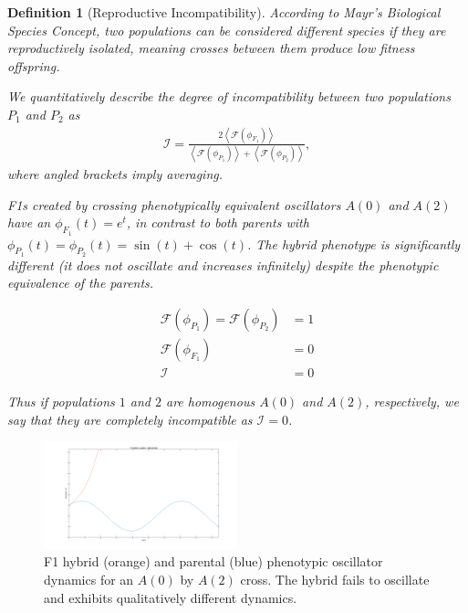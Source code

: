 \documentclass{article}
\newcommand{\1}{\mathbbm{1}}
\newtheorem{definition}{Definition}
\newtheorem{example}{Example}
\begin{document}
      \begin{definition}[Reproductive Incompatibility]
        According to Mayr's \emph{Biological Species Concept}, two populations can be considered different species if they are reproductively isolated, meaning crosses between them produce low fitness offspring.
        
        We quantitatively describe the degree of incompatibility between two populations $P_{1}$ and $P_{2}$ as
        \begin{align*}
          \mathcal{I} = \frac{2 \left\langle \mathcal{F} \left(\phi_{F_{1}}\right) \right\rangle}{\left\langle \mathcal{F} \left(\phi_{P_{1}}\right) \right\rangle +  \left\langle \mathcal{F} \left(\phi_{P_{2}}\right) \right\rangle} ,
        \end{align*}
        where angled brackets imply averaging. 

        F1s created by crossing phenotypically equivalent oscillators $A(0)$ and $A(2)$ have an $\phi_{F_{1}}(t) = e^{t}$, in contrast to both parents with $\phi_{P_{1}}(t) = \phi_{P_{2}}(t) = \sin(t) + \cos(t)$. The hybrid phenotype is significantly different (it does not oscillate and increases infinitely) despite the phenotypic equivalence of the parents.

        \begin{align*}
          \mathcal{F} \left(\phi_{P_{1}}\right) = \mathcal{F} \left( \phi_{P_{2}} \right) &= 1 \\
          \mathcal{F}\left(\phi_{F_{1}}\right) &= 0 \\
          \mathcal{I} &= 0
        \end{align*}

        Thus if populations $1$ and $2$ are homogenous $A(0)$ and $A(2)$, respectively, we say that they are completely incompatible as $\mathcal{I} = 0$.
      \end{definition}
      \begin{figure}[H]
        \centering
        \includegraphics[width=0.5\textwidth, height=0.25\paperheight]{expF1}
        \caption{F1 hybrid (orange) and parental (blue) phenotypic oscillator dynamics for an $A(0)$ by $A(2)$ cross. The hybrid fails to oscillate and exhibits qualitatively different dynamics.}
      \end{figure}
\end{document}
